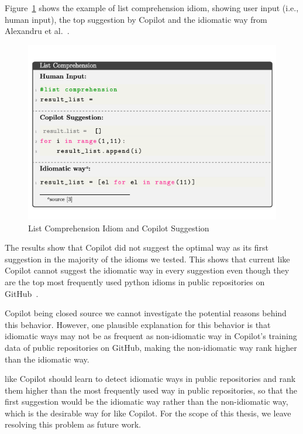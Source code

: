 Figure~\ref{fig:idioms_1} shows the example of list comprehension idiom, showing user input (i.e., human input), the top suggestion by Copilot and the idiomatic way from Alexandru et al.~\cite{Alexandru2018}.

\begin{figure}[hbt!]
    \centering
    \includegraphics[width=\linewidth]{Figures/idioms_1.png}
    \caption{List Comprehension Idiom and Copilot Suggestion}
    \label{fig:idioms_1}
\end{figure}

The results show that Copilot did not suggest the optimal way as its first suggestion in the majority of the idioms we tested. This shows that current \cct{} like Copilot cannot suggest the idiomatic way in every suggestion even though they are the top most frequently used python idioms in public repositories on GitHub~\cite{Alexandru2018}. 

Copilot being closed source we cannot investigate the potential reasons behind this behavior. However, one plausible explanation for this behavior is that idiomatic ways may not be as frequent as non-idiomatic way in Copilot's training data of public repositories on GitHub, making the non-idiomatic way rank higher than the idiomatic way.

\cct{} like Copilot should learn to detect idiomatic ways in public repositories and rank them higher than the most frequently used way in public repositories, so that the first suggestion would be the idiomatic way rather than the non-idiomatic way, which is the desirable way for \cct{} like Copilot. For the scope of this thesis, we leave resolving this problem as future work.

